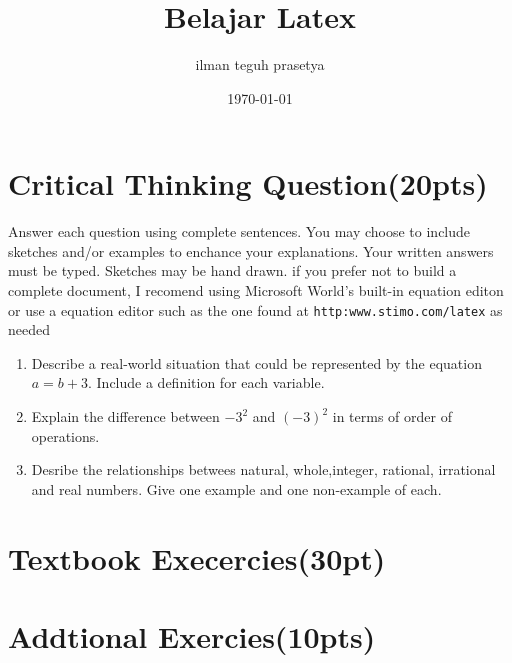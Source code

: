 \documentclass[12pt]{article}
\begin{document}
	\title{Belajar Latex}
	\author{ilman teguh prasetya}
	\date{\today}
	\maketitle
	\section{Critical Thinking Question(20pts)}
	
	Answer each question using complete sentences. You may choose to include sketches and/or examples to enchance your explanations. Your written answers must be typed. Sketches may be hand drawn. if you prefer not to build a complete document, I recomend using Microsoft World's built-in equation editon or use a equation editor such as the one found at \texttt{http:www.stimo.com/latex} as needed
	
	\begin{enumerate}
	\item Describe a real-world situation that could be represented by the equation $a=b+3$. Include a definition for each variable.
	\item Explain the difference between $-3^2$ and $(-3)^2$ in terms of order of operations.
	\item Desribe the relationships betwees natural, whole,integer, rational, irrational and real numbers. Give one example and one non-example of each.
	\end{enumerate}
	\section{Textbook Execercies(30pt)}
	\section{Addtional Exercies(10pts)}
\end{document}
